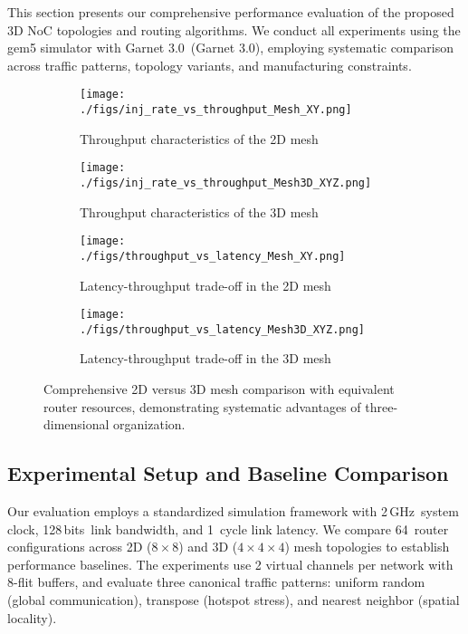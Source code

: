 \documentclass[11pt]{article}
\newcommand{\NumRoutersA}{64}         %
\newcommand{\Ruby}{Garnet 3.0}
\newcommand{\Clk}{2\,GHz}
\newcommand{\LinkW}{128\,bits}
\newcommand{\LinkLat}{1}              %
\begin{document}
This section presents our comprehensive performance evaluation of the proposed 3D NoC topologies and routing algorithms. We conduct all experiments using the gem5 simulator with \Ruby\ (Garnet 3.0), employing systematic comparison across traffic patterns, topology variants, and manufacturing constraints.
\begin{figure}[th]
    \centering
    \begin{subfigure}[t]{0.45\linewidth}
        \centering
        \texttt{[image: ./figs/inj\_rate\_vs\_throughput\_Mesh\_XY.png]}
        \caption{Throughput characteristics of the 2D mesh}
        \label{fig:mesh2d-performance}
    \end{subfigure}
    \hfill
    \begin{subfigure}[t]{0.45\linewidth}
        \centering
        \texttt{[image: ./figs/inj\_rate\_vs\_throughput\_Mesh3D\_XYZ.png]}
        \caption{Throughput characteristics of the 3D mesh}
        \label{fig:mesh3d-performance-comparison}
    \end{subfigure}
    
    \vspace{1em}
    
    \begin{subfigure}[t]{0.45\linewidth}
        \centering
        \texttt{[image: ./figs/throughput\_vs\_latency\_Mesh\_XY.png]}
        \caption{Latency-throughput trade-off in the 2D mesh}
        \label{fig:mesh2d-latency-throughput}
    \end{subfigure}
    \hfill
    \begin{subfigure}[t]{0.45\linewidth}
        \centering
        \texttt{[image: ./figs/throughput\_vs\_latency\_Mesh3D\_XYZ.png]}
        \caption{Latency-throughput trade-off in the 3D mesh}
        \label{fig:mesh3d-latency-throughput}
    \end{subfigure}
    \caption{Comprehensive 2D versus 3D mesh comparison with equivalent router resources, demonstrating systematic advantages of three-dimensional organization.}
    \label{fig:mesh-comparison-full}
\end{figure}
\subsection{Experimental Setup and Baseline Comparison}

Our evaluation employs a standardized simulation framework with \Clk\ system clock, \LinkW\ link bandwidth, and \LinkLat\ cycle link latency. We compare \NumRoutersA\ router configurations across 2D ($8{\times}8$) and 3D ($4{\times}4{\times}4$) mesh topologies to establish performance baselines. The experiments use 2 virtual channels per network with 8-flit buffers, and evaluate three canonical traffic patterns: uniform random (global communication), transpose (hotspot stress), and nearest neighbor (spatial locality).
\end{document}
